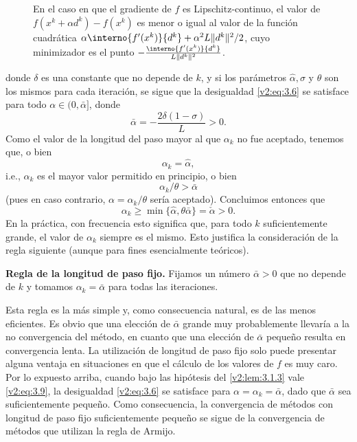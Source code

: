 \begin{figure}[htpb]
    \centering
    \caption{En el caso en que el gradiente de $f$ es Lipschitz-continuo, el valor de $f(x^k + \alpha d^k) - f(x^k)$ es menor o igual al valor de la función cuadrática $\alpha \interno{f'(x^k)}{d^k} + \alpha^2 L \|d^k\|^2 / 2$, cuyo minimizador es el punto $-\frac{\interno{f'(x^k)}{d^k}}{L\|d^k\|^2}$.}
    \label{v2:fig:3.1.4}
\end{figure}

donde $\delta$ es una constante que no depende de $k$, y si los parámetros $\hat{\alpha}, \sigma$ y $\theta$ son los mismos para cada iteración, se sigue que la desigualdad \eqref{v2:eq:3.6} se satisface para todo $\alpha \in (0, \bar{\alpha}]$, donde
\[
    \bar{\alpha} = -\frac{2\delta(1 - \sigma)}{L} > 0.
\]
Como el valor de la longitud del paso mayor al que $\alpha_k$ no fue aceptado, tenemos que, o bien
\[
    \alpha_k = \hat{\alpha},
\]
i.e., $\alpha_k$ es el mayor valor permitido en principio, o bien
\[
    \alpha_k/\theta > \bar{\alpha}
\]
(pues en caso contrario, $\alpha = \alpha_k/\theta$ sería aceptado). Concluimos entonces que
\[
    \alpha_k \ge \min\{\hat{\alpha}, \theta\bar{\alpha}\} = \check{\alpha} > 0.
\]
En la práctica, con frecuencia esto significa que, para todo $k$ suficientemente grande, el valor de $\alpha_k$ siempre es el mismo. Esto justifica la consideración de la regla siguiente (aunque para fines esencialmente teóricos).

\textbf{Regla de la longitud de paso fijo.} Fijamos un número $\bar{\alpha} > 0$ que no depende de $k$ y tomamos $\alpha_k = \bar{\alpha}$ para todas las iteraciones.

Esta regla es la más simple y, como consecuencia natural, es de las menos eficientes. Es obvio que una elección de $\bar{\alpha}$ grande muy probablemente llevaría a la no convergencia del método, en cuanto que una elección de $\bar{\alpha}$ pequeño resulta en convergencia lenta.
La utilización de longitud de paso fijo solo puede presentar alguna ventaja en situaciones en que el cálculo de los valores de $f$ es muy caro. Por lo expuesto arriba, cuando bajo las hipótesis del \cref{v2:lem:3.1.3} vale \eqref{v2:eq:3.9}, la desigualdad \eqref{v2:eq:3.6} se satisface para $\alpha = \alpha_k = \bar{\alpha}$, dado que $\bar{\alpha}$ sea suficientemente pequeño. Como consecuencia, la convergencia de métodos con longitud de paso fijo suficientemente pequeño se sigue de la convergencia de métodos que utilizan la regla de Armijo.

